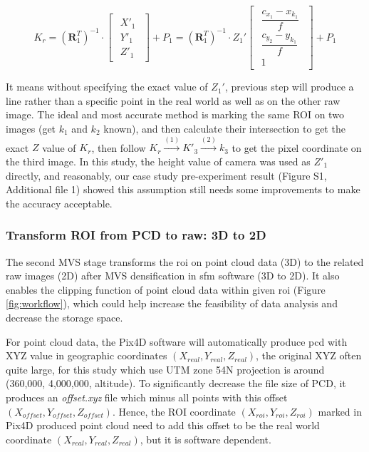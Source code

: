 \documentclass[doublespacing]{configs/bmcart}
\begin{document}
$$
  K_r = 
  \left(\mathbf{R}_1^T\right)^{-1} \cdot 
  \begin{bmatrix}
    \begin{matrix}
      X'_1 \\ Y'_1 \\ Z'_1
    \end{matrix}
  \end{bmatrix} + P_1
  =
  \left(\mathbf{R}_1^T\right)^{-1} \cdot Z_1'
  \begin{bmatrix}
    \begin{matrix}
      \dfrac{c_{x_1}- x_{k_1}}{f} \\ \dfrac{c_{y_2} - y_{k_1}}{f} \\ 1
    \end{matrix}
  \end{bmatrix} + P_1
$$

It means without specifying the exact value of $Z_1'$, previous step will produce a line rather than a specific point in the real world as well as on the other raw image. The ideal and most accurate method is marking the same ROI on two images (get $k_1$ and $k_2$ known), and then calculate their intersection to get the exact $Z$ value of $K_r$, then follow $K_r \xrightarrow{(1)} K'_3 \xrightarrow{(2)} k_3$ to get the pixel coordinate on the third image. In this study, the height value of camera was used as $Z'_1$ directly, and reasonably, our case study pre-experiment result (Figure S1, Additional file 1) showed this assumption still needs some improvements to make the accuracy acceptable.

\subsubsection*{Transform ROI from PCD to raw: 3D to 2D}
The second MVS stage transforms the \acrshort*{roi} on point cloud data (3D) to the related raw images (2D) after MVS densification in \acrshort*{sfm} software (3D to 2D). It also enables the clipping function of point cloud data within given \acrshort*{roi} (Figure \ref{fig:workflow}), which could help increase the feasibility of data analysis and decrease the storage space.

For point cloud data, the Pix4D software will automatically produce \acrshort*{pcd} with XYZ value in geographic coordinates $(X_{real}, Y_{real}, Z_{real})$, the original XYZ often quite large, for this study which use UTM zone 54N projection is around (360,000, 4,000,000,  altitude). To significantly decrease the file size of PCD, it produces an \textit{offset.xyz} file which minus all points with this offset $(X_{offset}, Y_{offset}, Z_{offset})$. Hence, the ROI coordinate $(X_{roi}, Y_{roi}, Z_{roi})$ marked in Pix4D produced point cloud need to add this offset to be the real world coordinate $(X_{real}, Y_{real}, Z_{real})$, but it is software dependent.
\end{document}
